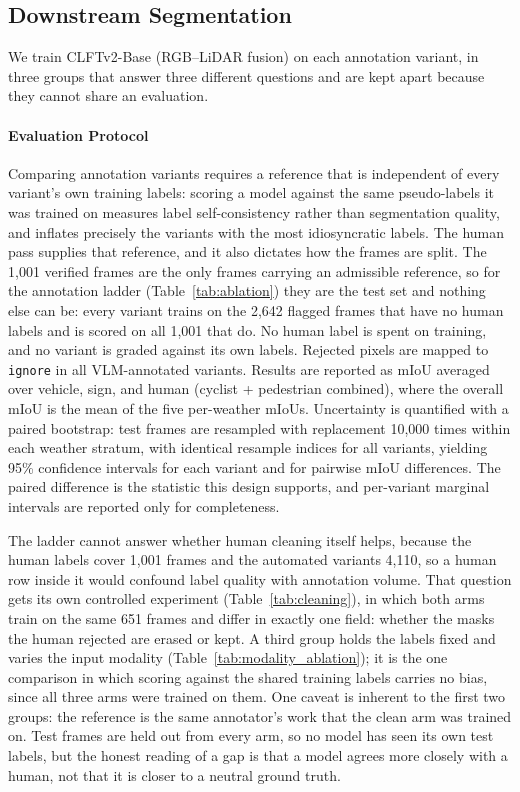 \documentclass[conference]{IEEEtran}
\begin{document}


\subsection{Downstream Segmentation}

We train CLFTv2-Base (RGB--LiDAR fusion) on each annotation variant, in three groups that answer three
different questions and are kept apart because they cannot share an evaluation.

\paragraph{Evaluation Protocol}
Comparing annotation variants requires a reference that is independent of every variant's own training labels: scoring a model against the same pseudo-labels it was trained on measures label self-consistency rather than segmentation quality, and inflates precisely the variants with the most idiosyncratic labels.
The human pass supplies that reference, and it also dictates how the frames are split.
The 1{,}001 verified frames are the only frames carrying an admissible reference, so for the annotation
ladder (Table~\ref{tab:ablation}) they are the test set and nothing else can be: every variant trains on
the 2{,}642 flagged frames that have no human labels and is scored on all 1{,}001 that do. No human
label is spent on training, and no variant is graded against its own labels.
Rejected pixels are mapped to \texttt{ignore} in all VLM-annotated variants.
Results are reported as mIoU averaged over vehicle, sign, and human (cyclist + pedestrian combined), where the overall mIoU is the mean of the five per-weather mIoUs.
Uncertainty is quantified with a paired bootstrap: test frames are resampled with replacement 10{,}000 times within each weather stratum, with identical resample indices for all variants, yielding 95\% confidence intervals for each variant and for pairwise mIoU differences.
The paired difference is the statistic this design supports, and per-variant marginal intervals are
reported only for completeness.

The ladder cannot answer whether human cleaning itself helps, because the human labels cover 1{,}001
frames and the automated variants 4{,}110, so a human row inside it would confound label quality with
annotation volume. That question gets its own controlled experiment (Table~\ref{tab:cleaning}), in which
both arms train on the same 651 frames and differ in exactly one field: whether the masks the human
rejected are erased or kept.
A third group holds the labels fixed and varies the input modality (Table~\ref{tab:modality_ablation});
it is the one comparison in which scoring against the shared training labels carries no bias, since all
three arms were trained on them.
One caveat is inherent to the first two groups: the reference is the same annotator's work that the
clean arm was trained on. Test frames are held out from every arm, so no model has seen its own test
labels, but the honest reading of a gap is that a model agrees more closely with a human, not that it
is closer to a neutral ground truth.
\end{document}
